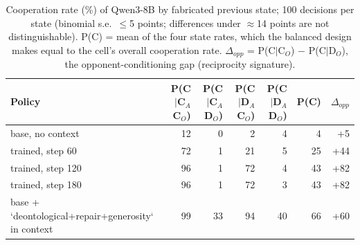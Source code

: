 \begin{table}[t]
\centering
\caption{Cooperation rate (\%) of Qwen3-8B by fabricated previous state; 100 decisions per state (binomial s.e.\ $\leq$5 points; differences under $\approx$14 points are not distinguishable). P(C) = mean of the four state rates, which the balanced design makes equal to the cell's overall cooperation rate. $\Delta_{opp}$ = P(C$\mid$C$_O$) $-$ P(C$\mid$D$_O$), the opponent-conditioning gap (reciprocity signature).}
\label{tab:post-training-grpo_deon_tft_200}
\small
\setlength{\tabcolsep}{3.5pt}
\begin{tabular}{lrrrrrr}
\toprule
Policy & P(C$\mid$C$_A$C$_O$) & P(C$\mid$C$_A$D$_O$) & P(C$\mid$D$_A$C$_O$) & P(C$\mid$D$_A$D$_O$) & P(C) & $\Delta_{opp}$ \\
\midrule
base, no context & 12 & 0 & 2 & 4 & 4 & +5 \\
trained, step 60 & 72 & 1 & 21 & 5 & 25 & +44 \\
trained, step 120 & 96 & 1 & 72 & 4 & 43 & +82 \\
trained, step 180 & 96 & 1 & 72 & 3 & 43 & +82 \\
base + `deontological+repair+generosity` in context & 99 & 33 & 94 & 40 & 66 & +60 \\
\bottomrule
\end{tabular}
\end{table}

